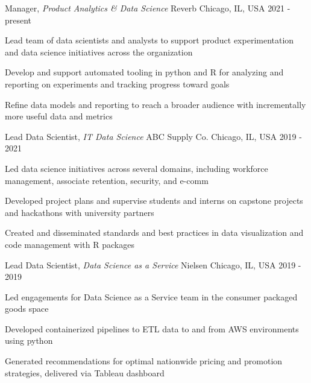 
\begin{cventries}

  \cventry
    {Manager, \textit{Product Analytics \& Data Science}} %
    {Reverb} %
    {Chicago, IL, USA} %
    {2021 - present} %
    {
      \begin{cvitems}
        \item {Lead team of data scientists and analysts to support product experimentation and data science initiatives across the organization}
        \item {Develop and support automated tooling in python and R for analyzing and reporting on experiments and tracking progress toward goals}
        \item {Refine data models and reporting to reach a broader audience with incrementally more useful data and metrics}        
      \end{cvitems}
    }

  \cventry
    {Lead Data Scientist, \textit{IT Data Science}} %
    {ABC Supply Co.} %
    {Chicago, IL, USA} %
    {2019 - 2021} %
    {
      \begin{cvitems}
        \item {Led data science initiatives across several domains, including workforce management, associate retention, security, and e-comm}
        \item {Developed project plans and supervise students and interns on capstone projects and hackathons with university partners}
        \item {Created and disseminated standards and best practices in data visualization and code management with R packages}
      \end{cvitems}
    }

 \cventry
    {Lead Data Scientist, \textit{Data Science as a Service}} %
    {Nielsen} %
    {Chicago, IL, USA} %
    {2019 - 2019} %
    {
      \begin{cvitems}
        \item {Led engagements for Data Science as a Service team in the consumer packaged goods space}
        \item {Developed containerized pipelines to ETL data to and from AWS environments using python}
        \item {Generated recommendations for optimal nationwide pricing and promotion strategies, delivered via Tableau dashboard}
      \end{cvitems}
    }


\end{cventries}
